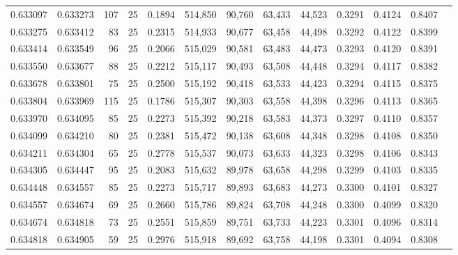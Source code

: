 \begin{tabular}{rrrrrrrrrrrrr}
0.633097 & 0.633273 &   107 &  25 &                                     0.1894 & 514,850 &  90,760 &  63,433 &  44,523 & 0.3291 & 0.4124 & 0.8407 \\
0.633275 & 0.633412 &    83 &  25 &                                     0.2315 & 514,933 &  90,677 &  63,458 &  44,498 & 0.3292 & 0.4122 & 0.8399 \\
0.633414 & 0.633549 &    96 &  25 &                                     0.2066 & 515,029 &  90,581 &  63,483 &  44,473 & 0.3293 & 0.4120 & 0.8391 \\
0.633550 & 0.633677 &    88 &  25 &                                     0.2212 & 515,117 &  90,493 &  63,508 &  44,448 & 0.3294 & 0.4117 & 0.8382 \\
0.633678 & 0.633801 &    75 &  25 &                                     0.2500 & 515,192 &  90,418 &  63,533 &  44,423 & 0.3294 & 0.4115 & 0.8375 \\
0.633804 & 0.633969 &   115 &  25 &                                     0.1786 & 515,307 &  90,303 &  63,558 &  44,398 & 0.3296 & 0.4113 & 0.8365 \\
0.633970 & 0.634095 &    85 &  25 &                                     0.2273 & 515,392 &  90,218 &  63,583 &  44,373 & 0.3297 & 0.4110 & 0.8357 \\
0.634099 & 0.634210 &    80 &  25 &                                     0.2381 & 515,472 &  90,138 &  63,608 &  44,348 & 0.3298 & 0.4108 & 0.8350 \\
0.634211 & 0.634304 &    65 &  25 &                                     0.2778 & 515,537 &  90,073 &  63,633 &  44,323 & 0.3298 & 0.4106 & 0.8343 \\
0.634305 & 0.634447 &    95 &  25 &                                     0.2083 & 515,632 &  89,978 &  63,658 &  44,298 & 0.3299 & 0.4103 & 0.8335 \\
0.634448 & 0.634557 &    85 &  25 &                                     0.2273 & 515,717 &  89,893 &  63,683 &  44,273 & 0.3300 & 0.4101 & 0.8327 \\
0.634557 & 0.634674 &    69 &  25 &                                     0.2660 & 515,786 &  89,824 &  63,708 &  44,248 & 0.3300 & 0.4099 & 0.8320 \\
0.634674 & 0.634818 &    73 &  25 &                                     0.2551 & 515,859 &  89,751 &  63,733 &  44,223 & 0.3301 & 0.4096 & 0.8314 \\
0.634818 & 0.634905 &    59 &  25 &                                     0.2976 & 515,918 &  89,692 &  63,758 &  44,198 & 0.3301 & 0.4094 & 0.8308 \\

\end{tabular}
